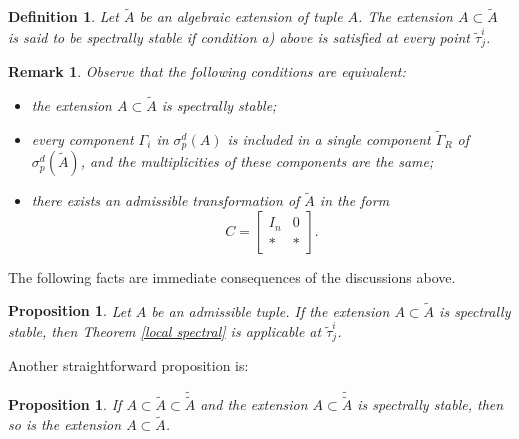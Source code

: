 \documentclass[draft, 12pt, reqno]{amsart}
\numberwithin{equation}{section}
\theoremstyle{plain}
\newtheorem{proposition}[theorem]{Proposition}
\newtheorem{remark}[theorem]{Remark}
\newtheorem{definition}[theorem]{Definition}
\begin{document}

\begin{definition}
Let $\widetilde{A}$ be an algebraic extension of tuple ${A}$. The extension $A\subset \widetilde{A}$ is said to be {\em spectrally stable} if condition a) above is satisfied at every point $\widetilde{\tau}_j^i$.
\end{definition}

\begin{remark} \normalfont 
Observe that the following conditions are equivalent:
\begin{itemize}
\item the extension $A\subset \widetilde{A}$ is spectrally stable;
\item every component $\Gamma_i$ in $\sigma_p^d(A)$ is included in a single component $\widetilde{\Gamma}_R$ of $\sigma_p^d(\widetilde{A})$, and the multiplicities of these components are the same;
\item there exists an admissible transformation of $\widetilde{A}$ in the form
$$ C=\left [\begin{array}{cc} I_n & 0 \\ * & * \end{array} \right ].$$
\end{itemize}
	
\end{remark}


The following facts are immediate consequences of the discussions above.

\begin{proposition}\label{spectral avail}
Let $A$ be an admissible tuple. If the extension $A\subset \widetilde{A}$ is spectrally stable, then Theorem \ref{local spectral} is applicable at $\widetilde{\tau}_j^i$.
\end{proposition}


Another straightforward proposition is:

\begin{proposition}\label{intermediate}
If $A\subset \widetilde{A}\subset \widetilde{\widetilde{A}}$ and the extension $A\subset \widetilde{\widetilde{A}}$ is spectrally stable, then so is the extension $A\subset \widetilde{A}$.
\end{proposition}
\end{document}
